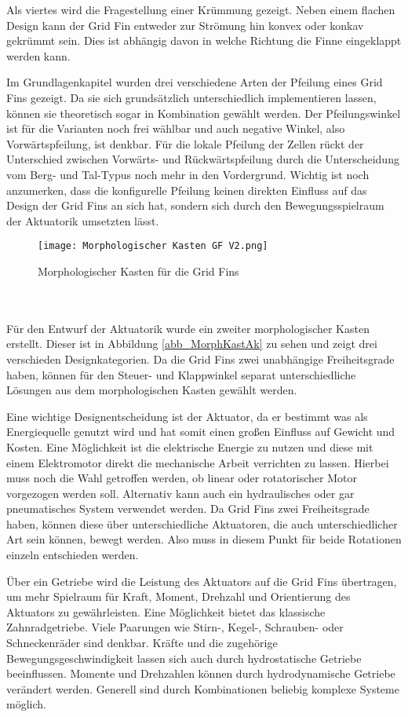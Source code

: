 Als viertes wird die Fragestellung einer Krümmung gezeigt. Neben einem flachen Design kann der Grid Fin entweder zur Strömung hin konvex oder konkav gekrümmt sein. Dies ist abhängig davon in welche Richtung die Finne eingeklappt werden kann.

Im Grundlagenkapitel wurden drei verschiedene Arten der Pfeilung eines Grid Fins gezeigt. Da sie sich grundsätzlich unterschiedlich implementieren lassen, können sie theoretisch sogar in Kombination gewählt werden. Der Pfeilungswinkel ist für die Varianten noch frei wählbar und auch negative Winkel, also Vorwärtspfeilung, ist denkbar. Für die lokale Pfeilung der Zellen rückt der Unterschied zwischen Vorwärts- und Rückwärtspfeilung durch die Unterscheidung vom Berg- und Tal-Typus noch mehr in den Vordergrund. Wichtig ist noch anzumerken, dass die konfigurelle Pfeilung keinen direkten Einfluss auf das Design der Grid Fins an sich hat, sondern sich durch den Bewegungsspielraum der Aktuatorik umsetzten lässt.
\begin{figure}[h]
	\centering
	\texttt{[image: Morphologischer Kasten GF V2.png]}
	\caption{Morphologischer Kasten für die Grid Fins}
	\label{abb_MorphKastGF}
\end{figure}\\~\\
Für den Entwurf der Aktuatorik wurde ein zweiter morphologischer Kasten erstellt. Dieser ist in Abbildung \ref{abb_MorphKastAk} zu sehen und zeigt drei verschieden Designkategorien. Da die Grid Fins zwei unabhängige Freiheitsgrade haben, können für den Steuer- und Klappwinkel separat unterschiedliche Lösungen aus dem morphologischen Kasten gewählt werden.

Eine wichtige Designentscheidung ist der Aktuator, da er bestimmt was als Energiequelle genutzt wird und hat somit einen großen Einfluss auf Gewicht und Kosten. Eine Möglichkeit ist die elektrische Energie zu nutzen und diese mit einem Elektromotor direkt die mechanische Arbeit verrichten zu lassen. Hierbei muss noch die Wahl getroffen werden, ob linear oder rotatorischer Motor vorgezogen werden soll. Alternativ kann auch ein hydraulisches oder gar pneumatisches System verwendet werden. Da Grid Fins zwei Freiheitsgrade haben, können diese über unterschiedliche Aktuatoren, die auch unterschiedlicher Art sein können, bewegt werden. Also muss in diesem Punkt für beide Rotationen einzeln entschieden werden.

Über ein Getriebe wird die Leistung des Aktuators auf die Grid Fins übertragen, um mehr Spielraum für Kraft, Moment, Drehzahl und Orientierung des Aktuators zu gewährleisten. Eine Möglichkeit bietet das klassische Zahnradgetriebe. Viele Paarungen wie Stirn-, Kegel-, Schrauben- oder Schneckenräder sind denkbar. Kräfte und die zugehörige Bewegungsgeschwindigkeit lassen sich auch durch hydrostatische Getriebe beeinflussen. Momente und Drehzahlen können durch hydrodynamische Getriebe verändert werden. Generell sind durch Kombinationen beliebig komplexe Systeme möglich.

